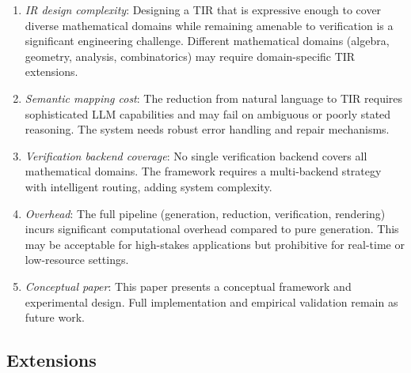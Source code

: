 \documentclass[11pt,a4paper]{article}
\begin{document}
\begin{enumerate}[leftmargin=*]
    \item \textit{IR design complexity}: Designing a TIR that is expressive enough to cover diverse mathematical domains while remaining amenable to verification is a significant engineering challenge. Different mathematical domains (algebra, geometry, analysis, combinatorics) may require domain-specific TIR extensions.
    
    \item \textit{Semantic mapping cost}: The reduction from natural language to TIR requires sophisticated LLM capabilities and may fail on ambiguous or poorly stated reasoning. The system needs robust error handling and repair mechanisms.
    
    \item \textit{Verification backend coverage}: No single verification backend covers all mathematical domains. The framework requires a multi-backend strategy with intelligent routing, adding system complexity.
    
    \item \textit{Overhead}: The full pipeline (generation, reduction, verification, rendering) incurs significant computational overhead compared to pure generation. This may be acceptable for high-stakes applications but prohibitive for real-time or low-resource settings.
    
    \item \textit{Conceptual paper}: This paper presents a conceptual framework and experimental design. Full implementation and empirical validation remain as future work.
\end{enumerate}

\subsection{Extensions}
\end{document}
